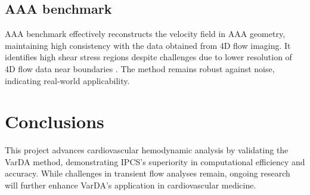 


\subsection*{AAA benchmark}
AAA benchmark effectively reconstructs the velocity field in AAA geometry, maintaining high consistency with the data obtained from 4D flow
imaging. It identifies high shear stress regions despite challenges due to lower resolution of 4D flow data near boundaries .
The method remains robust against noise, indicating real-world applicability. 

\section*{Conclusions}
This project advances cardiovascular hemodynamic analysis by validating the VarDA method, demonstrating IPCS's superiority in computational efficiency and accuracy. While challenges in transient flow analyses remain, ongoing research will further enhance VarDA's application in cardiovascular medicine.

